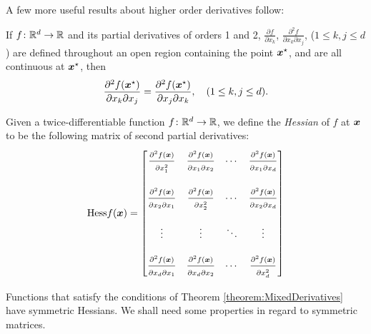 \separator

A few more useful results about higher order derivatives follow:

\begin{theorem}[Clairaut]\label{theorem:MixedDerivatives}
If $f\colon \mathbb{R}^d \to \mathbb{R}$ and its partial derivatives of orders 1 and 2, $\frac{\partial f}{\partial x_k}$, $\frac{\partial^2 f}{\partial x_k \partial x_j}$, ($1\leq k,j \leq d$) are defined throughout an open region containing the point $\boldsymbol{x}^{\star}$, and are all continuous at $\boldsymbol{x}^{\star}$, then 
\begin{equation*}
\frac{\partial^2 f(\boldsymbol{x}^{\star})}{\partial x_k \partial x_j} = \frac{\partial^2 f(\boldsymbol{x}^{\star})}{\partial x_j \partial x_k}, \quad (1\leq k,j \leq d). 
\end{equation*}
\end{theorem}

\begin{definition}[Hessian]\label{def:Hessian}
Given a twice-differentiable function $f\colon \mathbb{R}^d \to \mathbb{R}$, we define the \emph{Hessian} of $f$ at $\boldsymbol{x}$ to be the following matrix of second partial derivatives:
\begin{equation*}
\mathop{\mathrm{Hess}{f}}(\boldsymbol{x}) = \begin{bmatrix}
\frac{\strut\partial^2 f (\boldsymbol{x})}{\strut\partial x_1^2} & \frac{\strut\partial^2 f (\boldsymbol{x})}{\strut\partial x_1 \partial x_2} &\dotsb &\frac{\strut\partial^2 f (\boldsymbol{x})}{\strut\partial x_1 \partial x_d} \\
&&&\\
\frac{\strut\partial^2 f (\boldsymbol{x})}{\strut\partial x_2 \partial x_1} & \frac{\strut\partial^2 f (\boldsymbol{x})}{\strut\partial x_2^2} &\dotsb &\frac{\strut\partial^2 f (\boldsymbol{x})}{\strut\partial x_2 \partial x_d} \\
&&& \\
\vdots & \vdots &\ddots &\vdots \\
&&& \\
\frac{\strut\partial^2 f (\boldsymbol{x})}{\strut\partial x_d \partial x_1} & \frac{\strut\partial^2 f (\boldsymbol{x})}{\strut\partial x_d \partial x_2} &\dotsb &\frac{\strut\partial^2 f (\boldsymbol{x})}{\strut\partial x_d^2}
\end{bmatrix}
\end{equation*}
\end{definition}

\separator

Functions that satisfy the conditions of Theorem \ref{theorem:MixedDerivatives} have symmetric Hessians.  We shall need some properties in regard to symmetric matrices.

